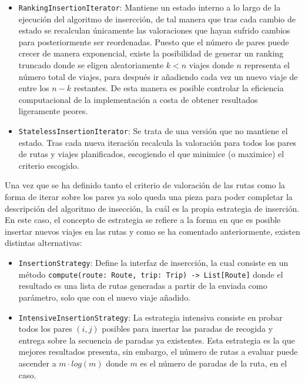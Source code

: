 \documentclass{subfiles}
\begin{document}
\begin{itemize}
\begin{itemize}
                      \item \texttt{RankingInsertionIterator}: Mantiene un estado interno a lo largo de la ejecución del algoritmo de insercción, de tal manera que tras cada cambio de estado se recalculan únicamente las valoraciones que hayan sufrido cambios para posteriormente ser reordenadas. Puesto que el número de pares puede crecer de manera exponencial, existe la posibilidad de generar un ranking truncado donde se eligen aleatoriamente $k < n$ viajes donde $n$ representa el número total de viajes, para después ir añadiendo cada vez un nuevo viaje de entre los $n-k$ restantes. De esta manera es posible controlar la eficiencia computacional de la implementación a costa de obtener resultados ligeramente peores.
                  
                      \item \texttt{StatelessInsertionIterator}: Se trata de una versión que no mantiene el estado. Tras cada nueva iteración recalcula la valoración para todos los pares de rutas y viajes planificados, escogiendo el que minimice (o maximice) el criterio escogido.
                  
                  \end{itemize}

                  Una vez que se ha definido tanto el criterio de valoración de las rutas como la forma de iterar sobre los pares ya solo queda una pieza para poder completar la descripción del algoritmo de insección, la cuál es la propia estrategia de inserción. En este caso, el concepto de estrategia se refiere a la forma en que es posible insertar nuevos viajes en las rutas y como se ha comentado anteriormente, existen distintas alternativas:

                  \begin{itemize}

                      \item \texttt{InsertionStrategy}: Define la interfaz de insercción, la cual consiste en un método \verb|compute(route: Route, trip: Trip) -> List[Route]| donde el resultado es una lista de rutas generadas a partir de la enviada como parámetro, solo que con el nuevo viaje añadido.
                  
                      \item \texttt{IntensiveInsertionStrategy}: La estrategia intensiva consiste en probar todos los pares $(i, j)$ posibles para insertar las paradas de recogida y entrega sobre la secuencia de paradas ya existentes. Esta estrategia es la que mejores resultados presenta, sin embargo, el número de rutas a evaluar puede ascender a $m \cdot log(m)$ donde $m$ es el número de paradas de la ruta, en el  caso.
                      

\end{itemize}
\end{itemize}
\end{document}
